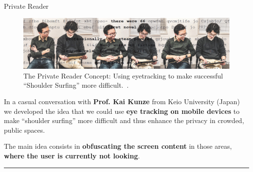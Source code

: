 


\begin{frame}{Private Reader}

\vspace{1em}
\begin{figure}
\includegraphics[width=\linewidth]{side/shouldersurfing.jpg}

\vspace{-1em}
\caption{\scriptsize The Private Reader Concept: Using eyetracking to make 
successful ``Shoulder Surfing'' more difficult.~\cite{Ragozin2019}.}
\end{figure}

\justifying

In a casual conversation with {\bf Prof. Kai Kunze} from Keio University (Japan)
we developed the idea that we could use {\bf eye tracking on mobile devices} to 
make ``shoulder surfing'' more difficult and thus enhance the privacy in
crowded, public spaces.

\vspace{1em}
The main idea consists in {\bf obfuscating the screen content} in those areas, 
{\bf where the user is currently not looking}. 


\vspace{1em}

\begin{center}
\rule{2cm}{0.4pt}\\[0.5em]
\end{center}


\end{frame}
